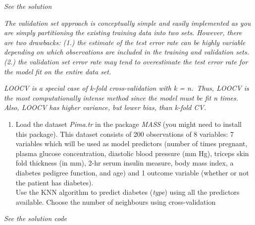 \documentclass[
]{book}
\providecommand{\tightlist}{%
  \setlength{\itemsep}{0pt}\setlength{\parskip}{0pt}}
\begin{document}
\emph{See the solution}

\emph{The validation set approach is conceptually simple and easily implemented as you are simply partitioning the existing training data into two sets. However, there are two drawbacks: (1.) the estimate of the test error rate can be highly variable depending on which observations are included in the training and validation sets. (2.) the validation set error rate may tend to overestimate the test error rate for the model fit on the entire data set.}

\emph{LOOCV is a special case of k-fold cross-validation with k = n.~Thus, LOOCV is the most computationally intense method since the model must be fit n times. Also, LOOCV has higher variance, but lower bias, than k-fold CV.}

\begin{enumerate}
\def\labelenumi{\arabic{enumi})}
\setcounter{enumi}{1}
\tightlist
\item
  Load the dataset \emph{Pima.tr} in the package \emph{MASS} (you might need
  to install this package). This dataset consists of 200 observations
  of 8 variables: 7 variables which will be used as model
  predictors (number of times pregnant, plasma glucose concentration, diastolic blood pressure (mm Hg), triceps skin fold thickness (in mm), 2-hr serum insulin measure, body mass index, a diabetes pedigree function, and age) and 1 outcome variable (whether or not the patient has diabetes).\\
  Use the KNN algorithm to predict diabetes (\emph{type}) using all the predictors available.
  Choose the number of neighbours using cross-validation
\end{enumerate}

\emph{See the solution code}
\end{document}
